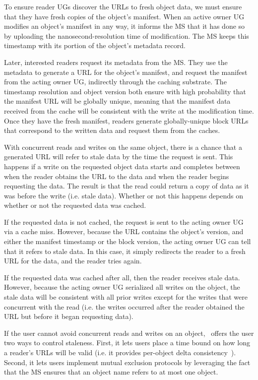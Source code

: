 To ensure reader UGs discover the URLs to fresh object data, we must ensure that they have fresh copies of the object's manifest. When an active owner UG modifies an object's manifest in any way, it informs the MS that it has done so by uploading the nanosecond-resolution time of modification. The MS keeps this timestamp with its portion of the object's metadata record.

Later, interested readers request its metadata from the MS. They use the metadata to generate a URL for the object's manifest, and request the manifest from the acting owner UG, indirectly through the caching substrate. The timestamp resolution and object version both ensure with high probability that the manifest URL will be globally unique, meaning that the manifest data received from the cache will be consistent with the write at the modification time. Once they have the fresh manifest, readers generate globally-unique block URLs that correspond to the written data and request them from the caches.

With concurrent reads and writes on the same object, there is a chance that a generated URL will refer to stale data by the time the request is sent. This happens if a write on the requested object data starts and completes between when the reader obtains the URL to the data and when the reader begins requesting the data. The result is that the read could return a copy of data as it was before the write (i.e. stale data). Whether or not this happens depends on whether or not the requested data was cached.

If the requested data is not cached, the request is sent to the acting owner UG via a cache miss. However, because the URL contains the object's version, and either the manifest timestamp or the block version, the acting owner UG can tell that it refers to stale data. In this case, it simply redirects the reader to a fresh URL for the data, and the reader tries again.

If the requested data was cached after all, then the reader receives stale data. However, because the acting owner UG serialized all writes on the object, the stale data will be consistent with all prior writes except for the writes that were concurrent with the read (i.e. the writes occurred after the reader obtained the URL but before it began requesting data).

If the user cannot avoid concurrent reads and writes on an object, \Syndicate\ offers the user two ways to control staleness. First, it lets users place a time bound on how long a reader's URLs will be valid (i.e. it provides per-object delta consistency~\cite{delta-consistency}). Second, it lets users implement mutual exclusion protocols by leveraging the fact that the MS ensures that an object name refers to at most one object.

